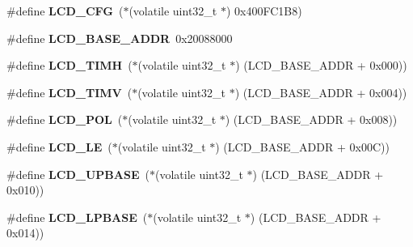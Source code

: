 \begin{DoxyCompactItemize}
\item 
\mbox{\label{group__lpc24xx__regs_ga801e41a247c4ed572909b57b9f810027}} 
\#define {\bfseries L\+C\+D\+\_\+\+C\+FG}~($\ast$(volatile uint32\+\_\+t $\ast$) 0x400\+F\+C1\+B8)
\item 
\mbox{\label{group__lpc24xx__regs_ga405c9ce00a2427280cbcdc6fe46a6f15}} 
\#define {\bfseries L\+C\+D\+\_\+\+B\+A\+S\+E\+\_\+\+A\+D\+DR}~0x20088000
\item 
\mbox{\label{group__lpc24xx__regs_ga0d897174a254e0935efa1a383baea9ab}} 
\#define {\bfseries L\+C\+D\+\_\+\+T\+I\+MH}~($\ast$(volatile uint32\+\_\+t $\ast$) (L\+C\+D\+\_\+\+B\+A\+S\+E\+\_\+\+A\+D\+DR + 0x000))
\item 
\mbox{\label{group__lpc24xx__regs_ga34c6b09a47b34281c1c04c50f7db2419}} 
\#define {\bfseries L\+C\+D\+\_\+\+T\+I\+MV}~($\ast$(volatile uint32\+\_\+t $\ast$) (L\+C\+D\+\_\+\+B\+A\+S\+E\+\_\+\+A\+D\+DR + 0x004))
\item 
\mbox{\label{group__lpc24xx__regs_ga9b0cd7ee8b0513bd7cd0c4d9826e8f02}} 
\#define {\bfseries L\+C\+D\+\_\+\+P\+OL}~($\ast$(volatile uint32\+\_\+t $\ast$) (L\+C\+D\+\_\+\+B\+A\+S\+E\+\_\+\+A\+D\+DR + 0x008))
\item 
\mbox{\label{group__lpc24xx__regs_ga53916f685b3d5cebba79d21cdf2f14e8}} 
\#define {\bfseries L\+C\+D\+\_\+\+LE}~($\ast$(volatile uint32\+\_\+t $\ast$) (L\+C\+D\+\_\+\+B\+A\+S\+E\+\_\+\+A\+D\+DR + 0x00\+C))
\item 
\mbox{\label{group__lpc24xx__regs_ga7929ba3e81c33af19048f829723add43}} 
\#define {\bfseries L\+C\+D\+\_\+\+U\+P\+B\+A\+SE}~($\ast$(volatile uint32\+\_\+t $\ast$) (L\+C\+D\+\_\+\+B\+A\+S\+E\+\_\+\+A\+D\+DR + 0x010))
\item 
\mbox{\label{group__lpc24xx__regs_gaedc70d82ed826b60767ad00573f27ce4}} 
\#define {\bfseries L\+C\+D\+\_\+\+L\+P\+B\+A\+SE}~($\ast$(volatile uint32\+\_\+t $\ast$) (L\+C\+D\+\_\+\+B\+A\+S\+E\+\_\+\+A\+D\+DR + 0x014))
\item 
\mbox{\label{group__lpc24xx__regs_ga8e945df7ca614325cafa08258e82a63c}} 

\end{DoxyCompactItemize}
